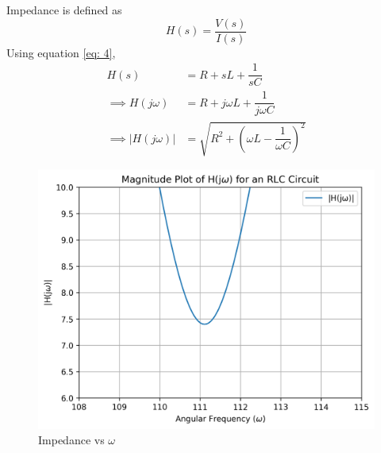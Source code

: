 \documentclass[journal,12pt,twocolumn]{IEEEtran}
\theoremstyle{remark}
\begin{document}
\begin{enumerate}
Impedance is defined as
\begin{equation}
    H(s) = \dfrac{V(s)}{I(s)}
\end{equation}
Using equation \eqref{eq: 4},
\begin{align}
     H(s) &= R + sL + \dfrac{1}{sC}\\
     \implies H(j\omega) &= R + j\omega L + \dfrac{1}{j\omega C}\\
     \implies \lvert H(j\omega) \rvert &= \sqrt{R^2 + \left(\omega L - \dfrac{1}{\omega C}\right)^2}
\end{align}
\begin{figure}[!h]
    \centering
    \includegraphics[width = \columnwidth]{figs/h_plot.png}
    \caption{Impedance vs $\omega$}
    \label{fig:h_plot}
\end{figure}
\end{enumerate}
\end{document}

